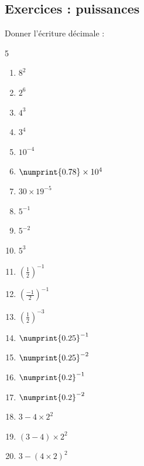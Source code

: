 \newpage 
{}  
\pagestyle{scrheadings} %
\onehalfspacing
\subsection{Exercices : puissances}
\begin{exercise}[\cancel{\faCalculator}] 
	Donner l'écriture décimale : 
	\begin{multicols}{5} 
		\begin{enumerate}[label=\textbullet\rule{0pt}{1.8em},leftmargin=*]
			\item $8^2$
			\item $2^6$
			\item $4^3$
			\item $3^4$
			\item $10^{-4}$
			\item $\numprint{0.78}\times 10^4$
			\item $30\times 19^{-5}$
			\item $5^{-1}$
			\item $5^{-2}$
			\item $5^{3}$
			\item  $\left(\tfrac{1}{2}\right)^{-1}$ 
			\item  $\left(\tfrac{-1}{2}\right)^{-1}$ 
			\item  $\left(\tfrac{1}{2}\right)^{-3}$ 
			\item $\numprint{0.25}^{-1}$
			\item $\numprint{0.25}^{-2}$
			\item $\numprint{0.2}^{-1}$
			\item $\numprint{0.2}^{-2}$  
			\item $3-4\times 2^2$
			\item $(3-4)\times 2^2$
			\item $3-(4\times2)^2$
		\end{enumerate}
	\end{multicols}  
\end{exercise}
